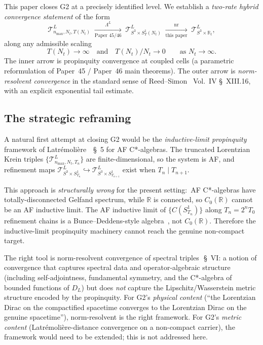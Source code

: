 \documentclass[11pt,a4paper]{article}
\theoremstyle{plain}
\theoremstyle{definition}
\newcommand{\nmax}{n_{\max}}
\newcommand{\Nt}{N_{t}}
\newcommand{\sthree}{S^{3}}
\newcommand{\Sone}{S^{1}}
\newcommand{\SoneT}{S^{1}_{T}}
\newcommand{\Manifoldlim}{S^{3}\times \mathbb{R}_{t}}
\newcommand{\Tcal}{\mathcal{T}}
\newcommand{\R}{\mathbb{R}}
\newcommand{\DL}{D_{L}}
\newcommand{\Lprop}{\Lambda^{L}}
\newcommand{\nr}{\mathrm{nr}}
\begin{document}
This paper closes G2 at a precisely identified level. We establish a
\emph{two-rate hybrid convergence statement} of the form
\begin{equation}\label{eq:two_rate_diagram}
\Tcal^{L}_{\nmax, \Nt, T(\Nt)}
\;\xrightarrow[\text{Paper 45/46}]{\;\Lprop\;}\;
\Tcal^{L}_{\sthree \times \SoneT(\Nt)}
\;\xrightarrow[\text{this paper}]{\;\nr\;}\;
\Tcal^{L}_{\Manifoldlim},
\end{equation}
along any admissible scaling
\begin{equation}\label{eq:admissible_scaling}
T(\Nt) \to \infty \quad \text{and} \quad T(\Nt)/\Nt \to 0 \qquad
\text{as } \Nt \to \infty.
\end{equation}
The inner arrow is propinquity convergence at coupled cells (a
parametric reformulation of Paper~45 / Paper~46 main theorems). The
outer arrow is \emph{norm-resolvent convergence} in the standard sense
of Reed--Simon~\cite{reed_simon_iv} Vol.~IV \S~XIII.16, with an
explicit exponential tail estimate.

\subsection{The strategic reframing}\label{sec:reframing}

A natural first attempt at closing G2 would be the
\emph{inductive-limit propinquity} framework of
Latr\'emoli\`ere~\cite{latremoliere2018}~\S~5 for AF C*-algebras. The
truncated Lorentzian Krein triples $\{\Tcal^{L}_{\nmax, \Nt, T_{n}}\}$
are finite-dimensional, so the system is AF, and refinement maps
$\Tcal^{L}_{\sthree\times \Sone_{T_{n}}}
\hookrightarrow \Tcal^{L}_{\sthree\times \Sone_{T_{n+1}}}$ exist when
$T_{n} \mid T_{n+1}$.

This approach is \emph{structurally wrong} for the present setting:\
AF C*-algebras have totally-disconnected Gelfand spectrum, while
$\R$ is connected, so $C_{0}(\R)$ cannot be an AF inductive limit. The
AF inductive limit of $\{C(\Sone_{T_{n}})\}$ along
$T_{n} = 2^{n}T_{0}$ refinement chains is a Bunce--Deddens-style
algebra~\cite{bunce_deddens1975}, not $C_{0}(\R)$. Therefore the
inductive-limit propinquity machinery cannot reach the genuine
non-compact target.

The right tool is norm-resolvent convergence of spectral
triples~\cite{connes1994}\,\S~VI: a notion of convergence that captures
spectral data and operator-algebraic structure (including
self-adjointness, fundamental symmetry, and the C*-algebra of bounded
functions of $\DL$) but does \emph{not} capture the
Lipschitz/Wasserstein metric structure encoded by the propinquity.
For G2's \emph{physical content} (``the Lorentzian Dirac on the
compactified spacetime converges to the Lorentzian Dirac on the
genuine spacetime''), norm-resolvent is the right framework. For G2's
\emph{metric content} (Latr\'emoli\`ere-distance convergence on a
non-compact carrier), the framework would need to be extended; this is
not addressed here.
\end{document}
